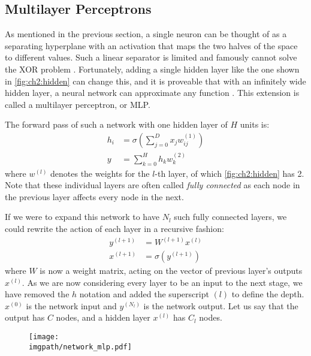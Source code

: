 \subsection{Multilayer Perceptrons}
As mentioned in the previous section, a single neuron can be thought of as a
separating hyperplane with an activation that maps the two halves of the space
to different values. Such a linear separator is limited and famously cannot
solve the XOR problem \cite{minsky_perceptrons:_1988}. Fortunately, adding a
single hidden layer like the one shown in \autoref{fig:ch2:hidden} can change
this, and it is proveable that with an infinitely wide hidden layer, a neural
network can approximate any function \cite{hornik_multilayer_1989,
cybenko_approximation_1989}. This extension is called a multilayer perceptron,
or MLP.

The forward pass of such a network with one hidden layer of $H$ units is:
%
\begin{align}
  h_i & =  \sigma\left(\sum_{j=0}^{D} x_j w_{ij}^{(1)}\right) \\
  y & =  \sum_{k=0}^{H} h_k w^{(2)}_{k}
\end{align}
%
where $w^{(l)}$ denotes the weights for the $l$-th layer, of which
\autoref{fig:ch2:hidden} has 2. Note that these individual layers are often
called \emph{fully connected} as each node in the previous layer affects every
node in the next.

If we were to expand this network to have $N_l$ such fully connected layers, we
could rewrite the action of each layer in a recursive fashion:
%
\begin{align}
  y^{(l+1)} &= W^{(l+1)}x^{(l)}  \label{eq:ch2:fc1}\\
  x^{(l+1)} &= \sigma\left(y^{(l+1)}\right) \label{eq:ch2:fc2}
\end{align}
where $W$ is now a weight matrix, acting on the vector of previous layer's
outputs $x^{(l)}$. As we are now considering every layer to be an input to the next
stage, we have removed the $h$ notation and added the superscript $(l)$ to
define the depth. $x^{(0)}$ is the network input and $y^{(N_l)}$ is the network
output. Let us say that the output has $C$ nodes, and a hidden layer $x^{(l)}$
has $C_l$ nodes.

\begin{figure}[t]
  \centering
  \texttt{[image: \\imgpath/network\_mlp.pdf]}
  \label{fig:ch2:hidden}
\end{figure}


